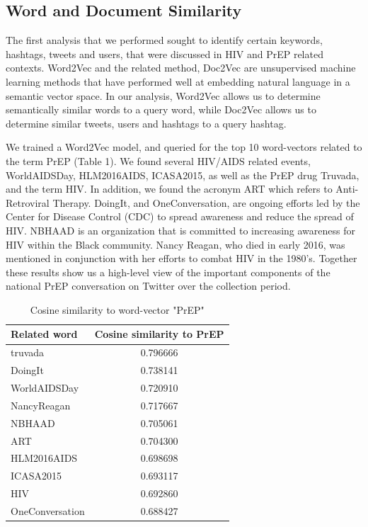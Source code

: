 \documentclass{sig-alternate-05-2015}
\begin{document}
\subsection{Word and Document Similarity}

The first analysis that we performed sought to identify certain keywords, hashtags, tweets and users, that were discussed in HIV and PrEP related contexts. Word2Vec and the related method, Doc2Vec are unsupervised machine learning methods that have performed well at embedding natural language in a semantic vector space. In our analysis, Word2Vec allows us to determine semantically similar words to a query word, while Doc2Vec allows us to determine similar tweets, users and hashtags to a query hashtag.

We trained a Word2Vec model, and queried for the top 10 word-vectors related to the term PrEP (Table 1). We found several HIV/AIDS related events, WorldAIDSDay, HLM2016AIDS, ICASA2015, as well as the PrEP drug Truvada, and the term HIV. In addition, we found the acronym ART which refers to Anti-Retroviral Therapy. DoingIt, and OneConversation, are ongoing efforts led by the Center for Disease Control (CDC) to spread awareness and reduce the spread of HIV. NBHAAD is an organization that is committed to increasing awareness for HIV within the Black community. Nancy Reagan, who died in early 2016, was mentioned in conjunction with her efforts to combat HIV in the 1980's. Together these results show us a high-level view of the important components of the national PrEP conversation on Twitter over the collection period.

\begin{table}
\centering
\caption{Cosine similarity to word-vector "PrEP"}
\begin{tabular}{|l|c|} \hline
Related word & Cosine similarity to PrEP\\ \hline
truvada & 0.796666\\ \hline
DoingIt & 0.738141\\ \hline
WorldAIDSDay & 0.720910\\ \hline
NancyReagan & 0.717667\\ \hline
NBHAAD & 0.705061\\ \hline
ART & 0.704300\\ \hline
HLM2016AIDS & 0.698698\\ \hline
ICASA2015 & 0.693117\\ \hline
HIV & 0.692860\\ \hline
OneConversation & 0.688427\\ \hline
\hline\end{tabular}
\end{table}
\end{document}

